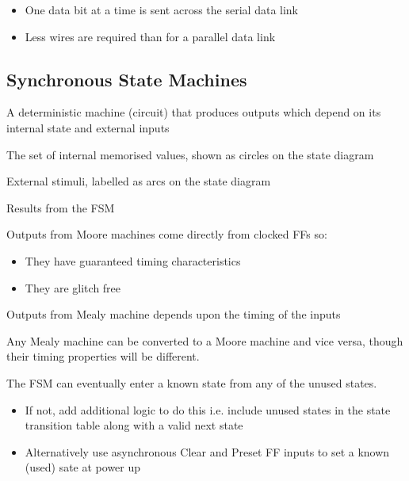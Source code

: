 \documentclass[a4paper]{article}
\begin{document}
\begin{defi}
\begin{itemize}
\item One data bit at a time is sent across the serial data link
\item Less wires are required than for a parallel data link
\end{itemize}
\end{defi}

\subsection{Synchronous State Machines}

\begin{defi}
A deterministic machine (circuit) that produces outputs which depend on its internal state and external inputs
\end{defi}
\begin{defi}[States]
The set of internal memorised values, shown as circles on the state diagram
\end{defi}
\begin{defi}[Inputs]
External stimuli, labelled as arcs on the state diagram
\end{defi}
\begin{defi}[outputs]
Results from the FSM
\end{defi}
\begin{defi}
Outputs from Moore machines come directly from clocked FFs so:
\begin{itemize}
\item They have guaranteed timing characteristics
\item They are glitch free
\end{itemize}
\end{defi}
\begin{defi}
Outputs from Mealy machine depends upon the timing of the inputs
\end{defi}
\begin{note}
Any Mealy machine can be converted to a Moore machine and vice versa, though their timing properties will be different.
\end{note}
\begin{defi}
The FSM can eventually enter a known state from any of the unused states.
\begin{itemize}
\item If not, add additional logic to do this i.e. include unused states in the state transition table along with a valid next state
\item Alternatively use asynchronous Clear and Preset FF inputs to set a known (used) sate at power up
\end{itemize}
\end{defi}
\end{document}
